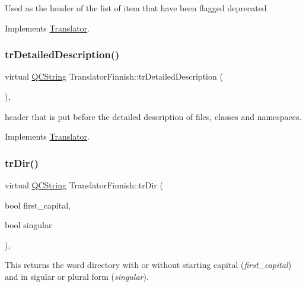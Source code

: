 Used as the header of the list of item that have been flagged deprecated 

Implements \mbox{\hyperlink{class_translator}{Translator}}.

\mbox{\label{class_translator_finnish_ac1414fea5760e95015271a28d7722750}} 
\subsubsection{\texorpdfstring{trDetailedDescription()}{trDetailedDescription()}}
{\footnotesize\ttfamily virtual \mbox{\hyperlink{class_q_c_string}{Q\+C\+String}} Translator\+Finnish\+::tr\+Detailed\+Description (\begin{DoxyParamCaption}{ }\end{DoxyParamCaption})\hspace{0.3cm}{\ttfamily [inline]}, {\ttfamily [virtual]}}

header that is put before the detailed description of files, classes and namespaces. 

Implements \mbox{\hyperlink{class_translator}{Translator}}.

\mbox{\label{class_translator_finnish_a15891263c1e258fb430f4e83e6bfd0b0}} 
\subsubsection{\texorpdfstring{trDir()}{trDir()}}
{\footnotesize\ttfamily virtual \mbox{\hyperlink{class_q_c_string}{Q\+C\+String}} Translator\+Finnish\+::tr\+Dir (\begin{DoxyParamCaption}\item[{bool}]{first\+\_\+capital,  }\item[{bool}]{singular }\end{DoxyParamCaption})\hspace{0.3cm}{\ttfamily [inline]}, {\ttfamily [virtual]}}

This returns the word directory with or without starting capital ({\itshape first\+\_\+capital}) and in sigular or plural form ({\itshape singular}). 

